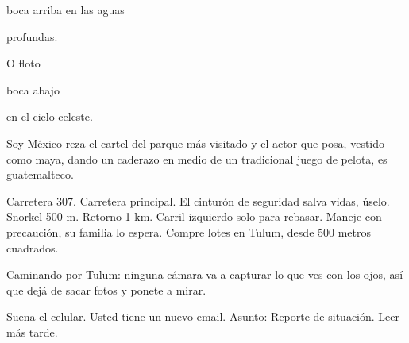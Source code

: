\documentclass[12pt,twoside,openright,a5paper]{book}
\begin{document}
boca arriba en las aguas

profundas.

O floto

boca abajo

en el cielo celeste.


\vspace{0.5cm}
\hrulefill\hspace{0.2cm} \decofourleft\decofourright \hspace{0.2cm} \hrulefill
\vspace{0.5cm}

Soy México reza el cartel del parque más visitado y el actor que posa,
vestido como maya, dando un caderazo en medio de un tradicional juego de
pelota, es guatemalteco.

\afterpage{}
\vspace{0.5cm}
\hrulefill\hspace{0.2cm} \decofourleft\decofourright \hspace{0.2cm} \hrulefill
\vspace{0.5cm}

Carretera 307. Carretera principal. El cinturón de seguridad salva
vidas, úselo. Snorkel 500  m. Retorno 1 km. Carril izquierdo solo para
rebasar. Maneje con precaución, su familia lo espera. Compre lotes en Tulum,
desde 500 metros cuadrados.


\vspace{0.5cm}
\hrulefill\hspace{0.2cm} \decofourleft\decofourright \hspace{0.2cm} \hrulefill
\vspace{0.5cm}

Caminando por Tulum: ninguna cámara va a capturar lo que ves con los ojos,
así que dejá de sacar fotos y ponete a mirar.


\vspace{0.5cm}
\hrulefill\hspace{0.2cm} \decofourleft\decofourright \hspace{0.2cm} \hrulefill
\vspace{0.5cm}

Suena el celular. Usted tiene un nuevo email. Asunto: Reporte de situación. Leer más tarde.



\vspace{0.5cm}
\hrulefill\hspace{0.2cm} \decofourleft\decofourright \hspace{0.2cm} \hrulefill
\vspace{0.5cm}
\end{document}
